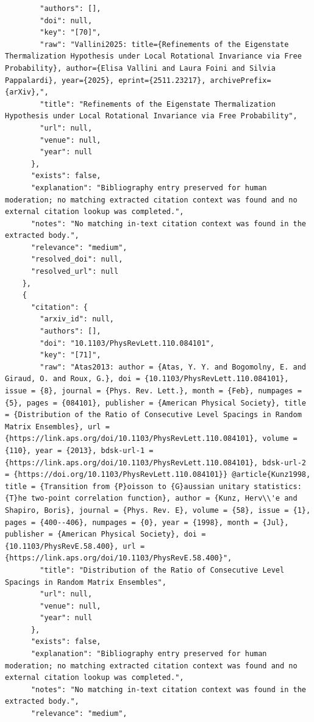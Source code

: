 \documentclass[11pt]{article}
\begin{document}
\begin{verbatim}
        "authors": [],
        "doi": null,
        "key": "[70]",
        "raw": "Vallini2025: title={Refinements of the Eigenstate Thermalization Hypothesis under Local Rotational Invariance via Free Probability}, author={Elisa Vallini and Laura Foini and Silvia Pappalardi}, year={2025}, eprint={2511.23217}, archivePrefix={arXiv},",
        "title": "Refinements of the Eigenstate Thermalization Hypothesis under Local Rotational Invariance via Free Probability",
        "url": null,
        "venue": null,
        "year": null
      },
      "exists": false,
      "explanation": "Bibliography entry preserved for human moderation; no matching extracted citation context was found and no external citation lookup was completed.",
      "notes": "No matching in-text citation context was found in the extracted body.",
      "relevance": "medium",
      "resolved_doi": null,
      "resolved_url": null
    },
    {
      "citation": {
        "arxiv_id": null,
        "authors": [],
        "doi": "10.1103/PhysRevLett.110.084101",
        "key": "[71]",
        "raw": "Atas2013: author = {Atas, Y. Y. and Bogomolny, E. and Giraud, O. and Roux, G.}, doi = {10.1103/PhysRevLett.110.084101}, issue = {8}, journal = {Phys. Rev. Lett.}, month = {Feb}, numpages = {5}, pages = {084101}, publisher = {American Physical Society}, title = {Distribution of the Ratio of Consecutive Level Spacings in Random Matrix Ensembles}, url = {https://link.aps.org/doi/10.1103/PhysRevLett.110.084101}, volume = {110}, year = {2013}, bdsk-url-1 = {https://link.aps.org/doi/10.1103/PhysRevLett.110.084101}, bdsk-url-2 = {https://doi.org/10.1103/PhysRevLett.110.084101}} @article{Kunz1998, title = {Transition from {P}oisson to {G}aussian unitary statistics: {T}he two-point correlation function}, author = {Kunz, Herv\\'e and Shapiro, Boris}, journal = {Phys. Rev. E}, volume = {58}, issue = {1}, pages = {400--406}, numpages = {0}, year = {1998}, month = {Jul}, publisher = {American Physical Society}, doi = {10.1103/PhysRevE.58.400}, url = {https://link.aps.org/doi/10.1103/PhysRevE.58.400}",
        "title": "Distribution of the Ratio of Consecutive Level Spacings in Random Matrix Ensembles",
        "url": null,
        "venue": null,
        "year": null
      },
      "exists": false,
      "explanation": "Bibliography entry preserved for human moderation; no matching extracted citation context was found and no external citation lookup was completed.",
      "notes": "No matching in-text citation context was found in the extracted body.",
      "relevance": "medium",

\end{verbatim}
\end{document}
